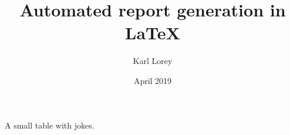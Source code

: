 \documentclass[11pt,a4paper]{report}
\begin{document}
\title{Automated report generation in LaTeX}
\author{Karl Lorey}
\date{April 2019}
\maketitle

\begin{table}
\centering
{\small

}
\caption{A small table with jokes.}
\end{table}
\end{document}
